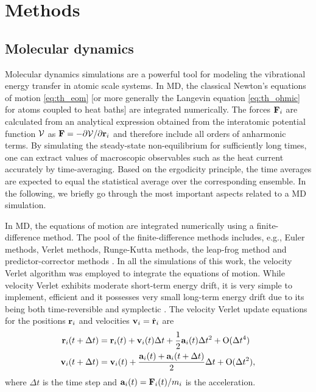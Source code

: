 
\chapter{Methods}

\label{chap:methods}

\section{Molecular dynamics}
\label{sec:th_md}

Molecular dynamics simulations are a powerful tool for modeling the vibrational energy transfer in atomic scale systems. In MD, the classical Newton's equations of motion \eqref{eq:th_eom} [or more generally the Langevin equation \eqref{eq:th_ohmic} for atoms coupled to heat baths] are integrated numerically. The forces $\mathbf{F}_i$ are calculated from an analytical expression obtained from the interatomic potential function $\mathcal{V}$ as $\mathbf{F}=-\partial \mathcal{V}/\partial \mathbf{r}_i$ and therefore include all orders of anharmonic terms. By simulating the steady-state non-equilibrium for sufficiently long times, one can extract values of macroscopic observables such as the heat current accurately by time-averaging. Based on the ergodicity principle, the time averages are expected to equal the statistical average over the corresponding ensemble. In the following, we briefly go through the most important aspects related to a MD simulation.


In MD, the equations of motion are integrated numerically using a finite-difference method. The pool of the finite-difference methods includes, e.g., Euler methods, Verlet methods, Runge-Kutta methods, the leap-frog method and predictor-corrector methods \cite{allentildesley}. In all the simulations of this work, the velocity Verlet algorithm was employed to integrate the equations of motion. While velocity Verlet exhibits moderate short-term energy drift, it is very simple to implement, efficient and it possesses very small long-term energy drift due to its being both time-reversible and symplectic \cite{frenkelsmit}. The velocity Verlet update equations for the positions $\mathbf{r}_i$ and velocities $\mathbf{v}_i=\dot{\mathbf{r}}_i$ are \cite{allentildesley}
\begin{alignat}{2}
  \mathbf{r}_i(t+\Delta t) &= \mathbf{r}_i(t) + \mathbf{v}_i(t)\Delta t+  \frac{1}{2}\mathbf{a}_i(t) \Delta t^2 + \mathrm{O}(\Delta t^4) \\
  \mathbf{v}_i(t+\Delta t) &= \mathbf{v}_i(t) + \frac{ \mathbf{a}_i(t)+\mathbf{a}_i(t+\Delta t)}{2} \Delta t+ \mathrm{O}(\Delta t^2) ,
\end{alignat}
where $\Delta t$ is the time step and $\mathbf{a}_i(t)=\mathbf{F}_i(t)/m_i$ is the acceleration.

